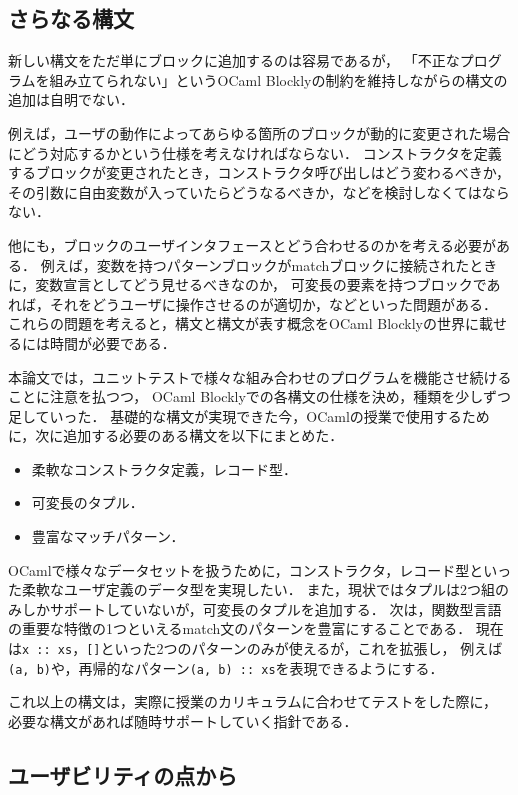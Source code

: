 \subsection*{さらなる構文}

新しい構文をただ単にブロックに追加するのは容易であるが，
「不正なプログラムを組み立てられない」というOCaml Blocklyの制約を維持しながらの構文の追加は自明でない．

例えば，ユーザの動作によってあらゆる箇所のブロックが動的に変更された場合にどう対応するかという仕様を考えなければならない．
コンストラクタを定義するブロックが変更されたとき，コンストラクタ呼び出しはどう変わるべきか，その引数に自由変数が入っていたらどうなるべきか，などを検討しなくてはならない． %

他にも，ブロックのユーザインタフェースとどう合わせるのかを考える必要がある．
例えば，変数を持つパターンブロックがmatchブロックに接続されたときに，変数宣言としてどう見せるべきなのか，
可変長の要素を持つブロックであれば，それをどうユーザに操作させるのが適切か，などといった問題がある．
これらの問題を考えると，構文と構文が表す概念をOCaml Blocklyの世界に載せるには時間が必要である．

本論文では，ユニットテストで様々な組み合わせのプログラムを機能させ続けることに注意を払つつ，
OCaml Blocklyでの各構文の仕様を決め，種類を少しずつ足していった．
基礎的な構文が実現できた今，OCamlの授業で使用するために，次に追加する必要のある構文を以下にまとめた．

\begin{itemize}
  \item 柔軟なコンストラクタ定義，レコード型．
  \item 可変長のタプル．
  \item 豊富なマッチパターン．
\end{itemize}

OCamlで様々なデータセットを扱うために，コンストラクタ，レコード型といった柔軟なユーザ定義のデータ型を実現したい．
また，現状ではタプルは2つ組のみしかサポートしていないが，可変長のタプルを追加する．
次は，関数型言語の重要な特徴の1つといえるmatch文のパターンを豊富にすることである．
現在は{\tt x ::\ xs}，{\tt []}といった2つのパターンのみが使えるが，これを拡張し，
例えば{\tt (a, b)}や，再帰的なパターン{\tt (a, b) ::\ xs}を表現できるようにする．

これ以上の構文は，実際に授業のカリキュラムに合わせてテストをした際に，
必要な構文があれば随時サポートしていく指針である．

\subsection*{ユーザビリティの点から}

